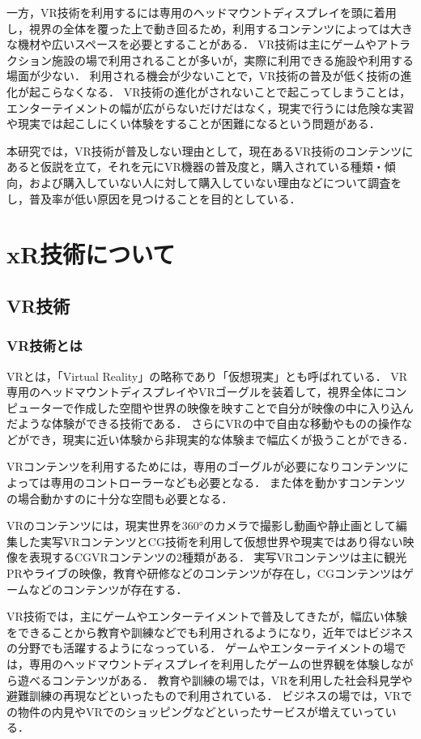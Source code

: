 \documentclass[12pt,a4j]{ltjsarticle}
\begin{document}
一方，VR技術を利用するには専用のヘッドマウントディスプレイを頭に着用し，視界の全体を覆った上で動き回るため，利用するコンテンツによっては大きな機材や広いスペースを必要とすることがある．
VR技術は主にゲームやアトラクション施設の場で利用されることが多いが，実際に利用できる施設や利用する場面が少ない．
利用される機会が少ないことで，VR技術の普及が低く技術の進化が起こらなくなる．
VR技術の進化がされないことで起こってしまうことは，エンターテイメントの幅が広がらないだけだはなく，現実で行うには危険な実習や現実では起こしにくい体験をすることが困難になるという問題がある．

本研究では，VR技術が普及しない理由として，現在あるVR技術のコンテンツにあると仮説を立て，それを元にVR機器の普及度と，購入されている種類・傾向，および購入していない人に対して購入していない理由などについて調査をし，普及率が低い原因を見つけることを目的としている．
\clearpage

\section{xR技術について}
\subsection{VR技術}
\subsubsection{VR技術とは}
VRとは，「Virtual Reality」の略称であり「仮想現実」とも呼ばれている．
VR専用のヘッドマウントディスプレイやVRゴーグルを装着して，視界全体にコンピューターで作成した空間や世界の映像を映すことで自分が映像の中に入り込んだような体験ができる技術である．
さらにVRの中で自由な移動やものの操作などができ，現実に近い体験から非現実的な体験まで幅広くが扱うことができる．

VRコンテンツを利用するためには，専用のゴーグルが必要になりコンテンツによっては専用のコントローラーなども必要となる．
また体を動かすコンテンツの場合動かすのに十分な空間も必要となる．

VRのコンテンツには，現実世界を360°のカメラで撮影し動画や静止画として編集した実写VRコンテンツとCG技術を利用して仮想世界や現実ではあり得ない映像を表現するCGVRコンテンツの2種類がある．
実写VRコンテンツは主に観光PRやライブの映像，教育や研修などのコンテンツが存在し，CGコンテンツはゲームなどのコンテンツが存在する．

VR技術では，主にゲームやエンターテイメントで普及してきたが，幅広い体験をできることから教育や訓練などでも利用されるようになり，近年ではビジネスの分野でも活躍するようになっっている．
ゲームやエンターテイメントの場では，専用のヘッドマウントディスプレイを利用したゲームの世界観を体験しながら遊べるコンテンツがある．
教育や訓練の場では，VRを利用した社会科見学や避難訓練の再現などといったもので利用されている．
ビジネスの場では，VRでの物件の内見やVRでのショッピングなどといったサービスが増えていっている．
\end{document}

